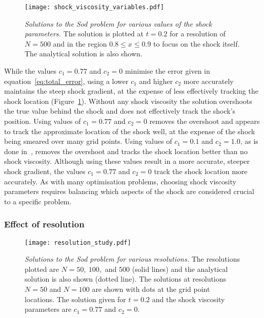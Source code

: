 \begin{figure}[t]
  \centering
  \texttt{[image: shock\_viscosity\_variables.pdf]}
  \caption{\emph{Solutions to the Sod problem for various values of the shock parameters.} The solution is plotted at $t=0.2$ for a resolution of $N=500$ and in the region $0.8 \leq x \leq 0.9$ to focus on the shock itself. The analytical solution is also shown.}%
  \label{fig:shock_viscosity_variables}
\end{figure}

While the values $c_1 = 0.77$ and $c_2 = 0$ minimise the error given in equation~\eqref{eq:total_error}, using a lower $c_1$ and higher $c_2$ more accurately maintains the steep shock gradient, at the expense of less effectively tracking the shock location (Figure~\ref{fig:shock_viscosity_variables}). Without any shock viscosity the solution overshoots the true value behind the shock and does not effectively track the shock's position. Using values of $c_1 = 0.77$ and $c_2 = 0$ removes the overshoot and appears to track the approximate location of the shock well, at the expense of the shock being smeared over many grid points. Using values of $c_1 = 0.1$ and $c_2 = 1.0$, as is done in~\cite{arberStaggeredGridLagrangian2001}, removes the overshoot and tracks the shock location better than no shock viscosity. Although using these values result in a more accurate, steeper shock gradient, the values $c_1 = 0.77$ and $c_2 = 0$ track the shock location more accurately. As with many optimisation problems, choosing shock viscosity parameters requires balancing which aspects of the shock are considered crucial to a specific problem. 

\subsubsection{Effect of resolution}

\begin{figure}[t]
  \centering
  \texttt{[image: resolution\_study.pdf]}
  \caption{\emph{Solutions to the Sod problem for various resolutions.} The resolutions plotted are $N=50,\ 100,$ and $500$ (solid lines) and the analytical solution is also shown (dotted line). The solutions at resolutions $N=50$ and $N=100$ are shown with dots at the grid point locations. The solution given for $t=0.2$ and the shock viscosity parameters are $c_1 = 0.77$ and $c_2 = 0$.}
  \label{fig:resolution_study}
\end{figure}

